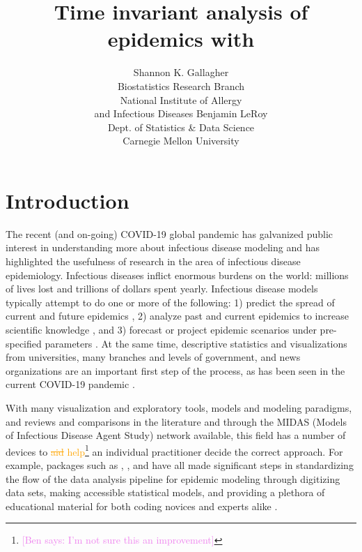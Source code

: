 \documentclass[
  shortnames]{jss}
\author{
Shannon K. Gallagher\\Biostatistics Research Branch\\
National Institute of Allergy\\
and Infectious Diseases \And Benjamin LeRoy\\Dept. of Statistics \& Data
Science\\
Carnegie Mellon University
}
\title{Time invariant analysis of epidemics with \pkg{EpiCompare}}
\begin{document}
\newcommand{\shannon}[1]{\textcolor{orange}{#1}}
\newcommand{\shan}[1]{\textcolor{brown}{#1}}
\newcommand{\ben}[1]{\textcolor{violet}{#1}}

\newtheorem{theorem}{Theorem}

\section[Intro]{Introduction}\label{sec:intro}

The recent (and on-going) COVID-19 global pandemic has galvanized public
interest in understanding more about infectious disease modeling and has
highlighted the usefulness of research in the area of infectious disease
epidemiology. Infectious diseases inflict enormous burdens on the world:
millions of lives lost and trillions of dollars spent yearly. Infectious
disease models typically attempt to do one or more of the following: 1)
predict the spread of current and future epidemics
\citep[e.g. flu prediction][]{Biggerstaff2016}, 2) analyze past and
current epidemics to increase scientific knowledge
\citep[e.g. historical measle outbreaks][]{Neal2004}, and 3) forecast or
project epidemic scenarios under pre-specified parameters
\citep[e.g.][]{ferguson2020}. At the same time, descriptive statistics
and visualizations from universities, many branches and levels of
government, and news organizations are an important first step of the
process, as has been seen in the current COVID-19 pandemic
\citep{dong2020,cdc-covid-tracker2021,wp-covid-tracker2021}.

With many visualization and exploratory tools, models and modeling
paradigms, and reviews and comparisons in the literature and through the
MIDAS (Models of Infectious Disease Agent Study) network
\citep{midasnetwork2021} available, this field has a number of devices
to \textcolor{orange}{\sout{aid}}
\textcolor{orange}{help}\footnote{\textcolor{violet}{[Ben says: I'm not sure this an improvement]}}
an individual practitioner decide the correct approach. For example,
 packages such as , , and
 have all made significant steps in standardizing the flow of
the data analysis pipeline for epidemic modeling through digitizing data
sets, making accessible statistical models, and providing a plethora of
educational material for both coding novices and experts alike
\citep{surveillance2017,Jenness2018,King2016}.
\end{document}

